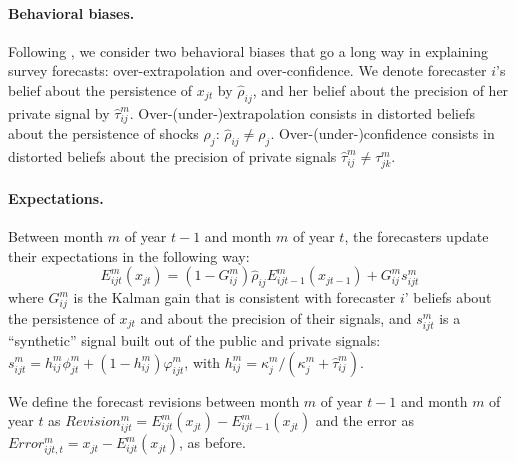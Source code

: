 \paragraph{Behavioral biases.}

Following \citet{Angeletosetal2020}, we consider two behavioral biases that go a long way in explaining survey forecasts: over-extrapolation and over-confidence. We denote forecaster $i$'s belief about the persistence of $x_{jt}$ by $\hat\rho_{ij}$, and her belief about the precision of her private signal by $\hat\tau_{ij}^m$. Over-(under-)extrapolation consists in distorted beliefs about the persistence of shocks $\rho_j$: $\hat\rho_{ij}\neq\rho_j$. Over-(under-)confidence consists in distorted beliefs about the precision of private signals $\hat\tau_{ij}^m\neq\tau_{jk}^m$.

\paragraph{Expectations.}

Between month $m$ of year $t-1$ and month $m$ of year $t$, the forecasters update their expectations in the following way:
\begin{equation}
	E_{ijt}^m(x_{jt})=(1-G_{ij}^m)\hat\rho_{ij}E_{ijt-1}^m(x_{jt-1})+G_{ij}^ms_{ijt}^m\label{eq:update}
\end{equation}
where $G_{ij}^m$ is the Kalman gain that is consistent with forecaster $i$' beliefs about the persistence of $x_{jt}$ and about the precision of their signals, and $s_{ijt}^m$ is a ``synthetic'' signal built out of the public and private signals: $s_{ijt}^m=h_{ij}^m\phi_{jt}^m+(1-h_{ij}^m)\varphi_{ijt}^m$, with $h_{ij}^m=\kappa_{j}^m/(\kappa_{j}^m+\hat\tau_{ij}^m)$. %

We define the forecast revisions between month $m$ of year $t-1$ and month $m$ of year $t$ as
$Revision_{ijt}^m=E_{ijt}^m(x_{jt})-E_{ijt-1}^m(x_{jt})$ and the error as $Error_{ijt,t}^m=x_{jt}-E_{ijt}^m(x_{jt})$, as before.


